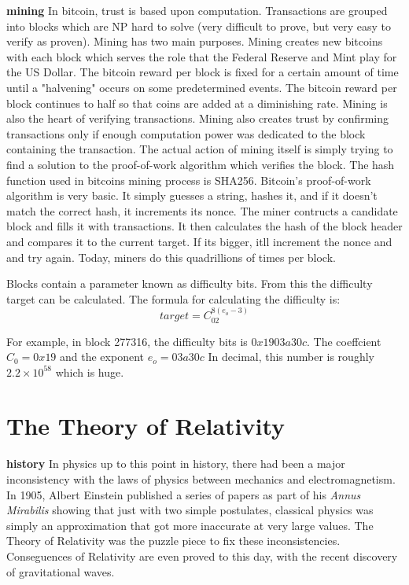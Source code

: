 \documentclass[conference]{IEEEtran}
\begin{document}
\textbf{mining} In bitcoin, trust is based upon computation. Transactions are grouped into blocks which are NP hard to solve (very difficult to prove, but very easy to verify as proven). Mining has two main purposes. Mining creates new bitcoins with each block which serves the role that the Federal Reserve and Mint play for the US Dollar. The bitcoin reward per block is fixed for a certain amount of time until a "halvening" occurs on some predetermined events. The bitcoin reward per block continues to half so that coins are added at a diminishing rate. Mining is also the heart of verifying transactions. Mining also creates trust by confirming transactions only if enough computation power was dedicated to the block containing the transaction. The actual action of mining itself is simply trying to find a solution to the proof-of-work algorithm which verifies the block. The hash function used in bitcoins mining process is SHA256. Bitcoin's proof-of-work algorithm is very basic. It simply guesses a string, hashes it, and if it doesn't match the correct hash, it increments its nonce. The miner contructs a candidate block and fills it with transactions. It then calculates the hash of the block header and compares it to the current target. If its bigger, itll increment the nonce and and try again. Today, miners do this quadrillions of times per block. 

Blocks contain a parameter known as difficulty bits. From this the difficulty target can be calculated. The formula for calculating the difficulty is: 
\begin{equation}
target = C_02^{8(e_o - 3)}
\end{equation}

For example, in block 277316, the difficulty bits is $0x1903a30c$. The coeffcient $C_0 = 0x19$ and the exponent $e_o = 03a30c$ In decimal, this number is roughly $2.2 \times 10^{58}$ which is huge.

\section{The Theory of Relativity}
\textbf{history} In physics up to this point in history, there had been a major inconsistency with the laws of physics between mechanics and electromagnetism. In 1905, Albert Einstein published a series of papers as part of his \textit{Annus Mirabilis} showing that just with two simple postulates, classical physics was simply an approximation that got more inaccurate at very large values. The Theory of Relativity was the puzzle piece to fix these inconsistencies. Conseguences of Relativity are even proved to this day, with the recent discovery of gravitational waves. 
\end{document}
